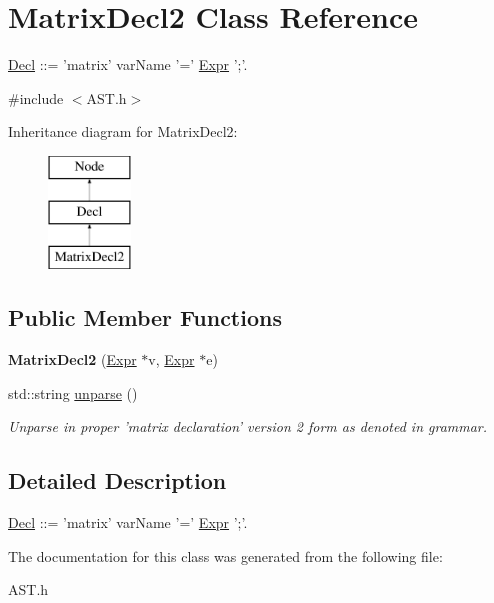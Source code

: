 \hypertarget{classMatrixDecl2}{\section{Matrix\-Decl2 Class Reference}
\label{classMatrixDecl2}
}


\hyperlink{classDecl}{Decl} \-:\-:= 'matrix' var\-Name '=' \hyperlink{classExpr}{Expr} ';'.  




{\ttfamily \#include $<$A\-S\-T.\-h$>$}

Inheritance diagram for Matrix\-Decl2\-:\begin{figure}[H]
\begin{center}
\leavevmode
\includegraphics[height=3.000000cm]{classMatrixDecl2}
\end{center}
\end{figure}
\subsection*{Public Member Functions}
\begin{DoxyCompactItemize}
\item 
\hypertarget{classMatrixDecl2_aca5dfa8bd7c19a2ce63463245d708dd9}{{\bfseries Matrix\-Decl2} (\hyperlink{classExpr}{Expr} $\ast$v, \hyperlink{classExpr}{Expr} $\ast$e)}\label{classMatrixDecl2_aca5dfa8bd7c19a2ce63463245d708dd9}

\item 
\hypertarget{classMatrixDecl2_ac6c560f16e2f8b032fb1d34274d44c84}{std\-::string \hyperlink{classMatrixDecl2_ac6c560f16e2f8b032fb1d34274d44c84}{unparse} ()}\label{classMatrixDecl2_ac6c560f16e2f8b032fb1d34274d44c84}

\begin{DoxyCompactList}\small\item\em Unparse in proper 'matrix declaration' version 2 form as denoted in grammar. \end{DoxyCompactList}\end{DoxyCompactItemize}


\subsection{Detailed Description}
\hyperlink{classDecl}{Decl} \-:\-:= 'matrix' var\-Name '=' \hyperlink{classExpr}{Expr} ';'. 

The documentation for this class was generated from the following file\-:\begin{DoxyCompactItemize}
\item 
A\-S\-T.\-h\end{DoxyCompactItemize}
